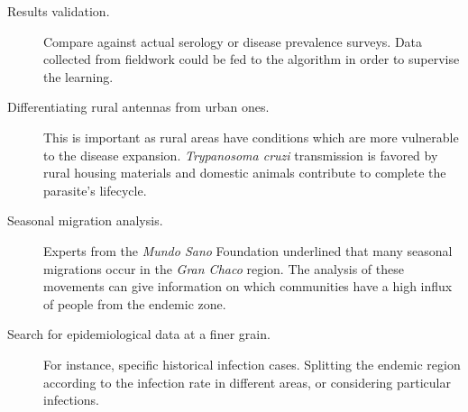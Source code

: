 \begin{description}
    \item [Results validation.] Compare against actual serology or disease prevalence surveys. Data collected from fieldwork could be fed to the algorithm in order to supervise the learning. 
    
    \item [Differentiating rural antennas from urban ones.] This is important as rural areas have conditions which are more vulnerable to the disease expansion. \textit{Trypanosoma cruzi} transmission is favored by rural housing materials and domestic animals contribute to complete the parasite's lifecycle.

    \item [Seasonal migration analysis.] Experts from the \textit{Mundo Sano} Foundation underlined that many seasonal migrations occur in the \textit{Gran Chaco} region. 
      The analysis of these movements can give information on which communities have a high influx of people from the endemic zone.

    \item [Search for epidemiological data at a finer grain.] For instance, specific historical infection cases. Splitting the endemic region according to the infection rate in different areas, or considering particular infections.
\end{description}
